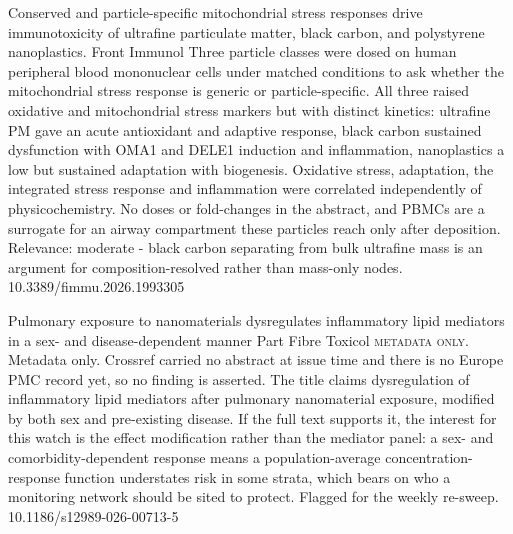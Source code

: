 \documentclass[10pt]{article}
\begin{document}
{Conserved and particle-specific mitochondrial stress responses drive immunotoxicity of ultrafine particulate matter, black carbon, and polystyrene nanoplastics.}
{Front Immunol}
{Three particle classes were dosed on human peripheral blood mononuclear cells under matched conditions to ask whether the mitochondrial stress response is generic or particle-specific. All three raised oxidative and mitochondrial stress markers but with distinct kinetics: ultrafine PM gave an acute antioxidant and adaptive response, black carbon sustained dysfunction with OMA1 and DELE1 induction and inflammation, nanoplastics a low but sustained adaptation with biogenesis. Oxidative stress, adaptation, the integrated stress response and inflammation were correlated independently of physicochemistry. No doses or fold-changes in the abstract, and PBMCs are a surrogate for an airway compartment these particles reach only after deposition. Relevance: moderate - black carbon separating from bulk ultrafine mass is an argument for composition-resolved rather than mass-only nodes.}
{10.3389/fimmu.2026.1993305}

{Pulmonary exposure to nanomaterials dysregulates inflammatory lipid mediators in a sex- and disease-dependent manner}
{Part Fibre Toxicol}
{\textsc{metadata only.} Metadata only. Crossref carried no abstract at issue time and there is no Europe PMC record yet, so no finding is asserted. The title claims dysregulation of inflammatory lipid mediators after pulmonary nanomaterial exposure, modified by both sex and pre-existing disease. If the full text supports it, the interest for this watch is the effect modification rather than the mediator panel: a sex- and comorbidity-dependent response means a population-average concentration-response function understates risk in some strata, which bears on who a monitoring network should be sited to protect. Flagged for the weekly re-sweep.}
{10.1186/s12989-026-00713-5}

\par{}\baselineskip{}\baselineskip
{}
\end{document}
